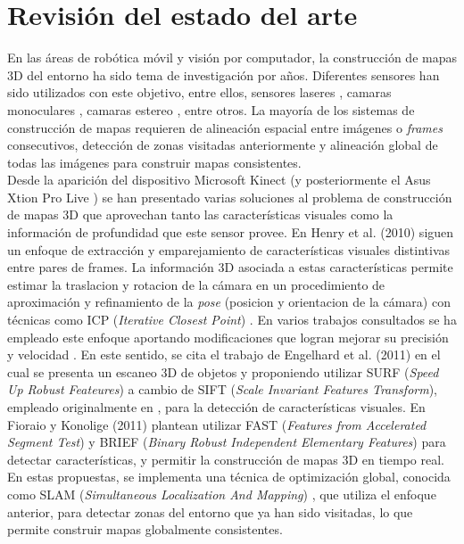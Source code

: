 \chapter{Revisión del estado del arte}
\label{cap:estado-del-arte}

En las áreas de robótica móvil y visión por computador, la construcción de mapas 3D del entorno ha sido tema de investigación por años. Diferentes sensores han sido utilizados con este objetivo, entre ellos, sensores laseres \cite{chou2013robotic,Montemerlo02fastslam}, camaras monoculares \cite{tomono2009robust,clemente_etal_rss2007}, camaras estereo \cite{Mei11,Konolige08}, entre otros. La mayoría de los sistemas de construcción de mapas requieren de alineación espacial entre imágenes o \textit{frames} consecutivos, detección de zonas visitadas anteriormente y alineación global de todas las imágenes para construir mapas consistentes. \\
Desde la aparición del dispositivo Microsoft Kinect (y posteriormente el Asus Xtion Pro Live \cite{asus-xtion-pro-live}) se han presentado varias soluciones al problema de construcción de mapas 3D que aprovechan tanto las características visuales como la información de profundidad que este sensor provee. En Henry et al. (2010) \cite{henry2010rgb} siguen un enfoque de extracción y emparejamiento de características visuales distintivas entre pares de frames. La información 3D asociada a estas características permite estimar la traslacion y rotacion de la cámara en un procedimiento de aproximación y refinamiento de la \textit{pose} (posicion y orientacion de la cámara) con técnicas como ICP (\textit{Iterative Closest Point}) \cite{Besl92}. En varios trabajos consultados se ha empleado este enfoque aportando modificaciones que logran mejorar su precisión y velocidad \cite{engelhard2011real,hogmanbuilding,fioraio2011realtime,6614623}. En este sentido, se cita el trabajo de Engelhard et al. (2011) \cite{engelhard2011real} en el cual se presenta un escaneo 3D de objetos y proponiendo utilizar SURF (\textit{Speed Up Robust Feateures}) \cite{bay2008speeded} a cambio de SIFT (\textit{Scale Invariant Features Transform}), empleado originalmente en \cite{henry2010rgb}, para la detección de características visuales. En Fioraio y Konolige (2011) \cite{fioraio2011realtime} plantean utilizar FAST (\textit{Features from Accelerated Segment Test})\cite{Rosten06machinelearning} y BRIEF (\textit{Binary Robust Independent Elementary Features}) \cite{Calonder12} para detectar características, y permitir la construcción de mapas 3D en tiempo real. En estas propuestas, se implementa una técnica de optimización global, conocida como SLAM (\textit{Simultaneous Localization And Mapping}) \cite{wiki-slam}, que utiliza el enfoque anterior, para detectar zonas del entorno que ya han sido visitadas, lo que permite construir mapas globalmente consistentes. \\
